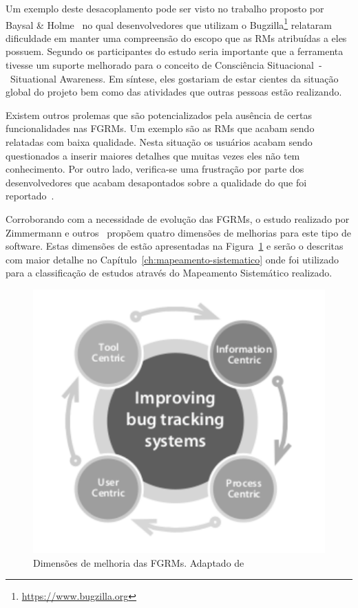 Um exemplo deste desacoplamento pode ser visto no trabalho proposto por Baysal
\& Holme~\cite{baysal2012qualitative} no qual desenvolvedores que utilizam o
Bugzilla\footnote{\url{https://www.bugzilla.org}} relataram dificuldade em
manter uma compreensão do escopo que as RMs atribuídas a eles possuem. Segundo
os participantes do estudo seria importante que a ferramenta tivesse um suporte
melhorado para o conceito de Consciência Situacional~-~Situational Awareness. Em
síntese, eles gostariam de estar cientes da situação global do projeto bem como
das atividades que outras pessoas estão realizando.

Existem outros prolemas que são potencializados pela ausência de certas
funcionalidades nas FGRMs. Um exemplo são as RMs que acabam sendo
relatadas com baixa qualidade. Nesta situação os usuários acabam sendo
questionados a inserir maiores detalhes que muitas vezes eles não tem
conhecimento. Por outro lado, verifica-se uma frustração por parte dos
desenvolvedores que acabam desapontados sobre a qualidade do que foi
reportado~\cite{just2008towards}.

Corroborando com a necessidade de evolução das FGRMs, o estudo realizado por
Zimmermann e outros~\cite{zimmermann2009improving} propõem quatro
dimensões de melhorias para este tipo de software. Estas dimensões de estão
apresentadas na Figura~\ref{fig:dimensoes_melhorias_fgrm} e serão o descritas
com maior detalhe no Capítulo~\ref{ch:mapeamento-sistematico} onde foi utilizado
para a classificação de estudos através do Mapeamento Sistemático realizado.


\begin{figure}[htpb] \centering
	\includegraphics[width=0.666666\linewidth]
	{chapter-intro/img/dimensoes_melhorias_fgrm.pdf}
	\caption{Dimensões de melhoria das FGRMs. Adaptado
		de~\cite{zimmermann2005mining}}\label{fig:dimensoes_melhorias_fgrm}
\end{figure}

